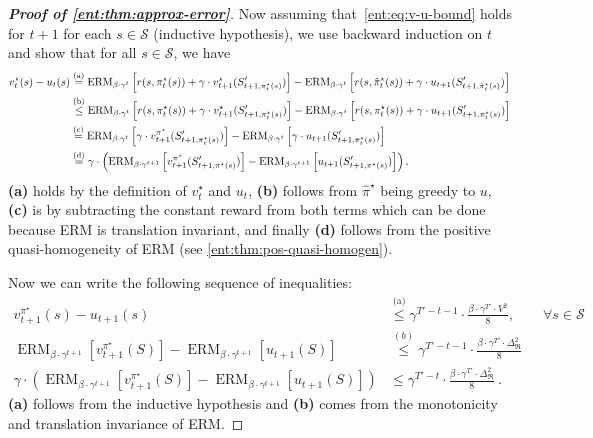 \documentclass[twoside]{article}
\newcommand{\states}{\mathcal{S}}
\newcommand{\opt}{^\star}
\newcommand{\vspan}{\Delta_{\mathfrak{R}}}
\newcommand{\erm}[2]{\operatorname{ERM}_{#1}\left[#2\right]}
\theoremstyle{plain}
\theoremstyle{definition}
\theoremstyle{remark}
\begin{document}
\begin{proof}[\bf\em Proof of \cref{ent:thm:approx-error}]
Now assuming that~\eqref{ent:eq:v-u-bound} holds for $t+1$ for each $s\in \states$ (inductive hypothesis), we use backward induction on $t$ and show that for all $s\in\mathcal S$, we have
%
\begin{align}
\notag v_t\opt (s) -  u_t(s) &\stackrel{\text{(a)}}{=} \erm{\beta \cdot \gamma^t} {r(s,\pi\opt_t (s)) + \gamma \cdot v\opt_{t+1}(S'_{t+1,\pi\opt_t(s)}) } - \erm{\beta \cdot \gamma^t} { r(s,\hat{\pi}\opt_t(s)) + \gamma \cdot u_{t+1}(S'_{t+1,\hat{\pi}\opt_t(s)}) } \\
\notag &\stackrel{\text{(b)}}{\leq} \erm{\beta \cdot \gamma^t} { r(s,\pi\opt_t (s)) + \gamma \cdot v\opt_{t+1}(S'_{t+1,\pi\opt_t(s)}) } - \erm{\beta \cdot \gamma^t} { r(s,\pi\opt_t(s)) + \gamma \cdot u_{t+1}(S'_{t+1,\pi\opt_t(s)}) } \\
\notag &\stackrel{\text{(c)}}{=} \erm{\beta \cdot \gamma^t} { \gamma \cdot v^{\pi\opt}_{t+1}(S'_{t+1,\pi\opt_t(s)}) } -  \erm{\beta \cdot \gamma^t} { \gamma \cdot u_{t+1}(S'_{t+1,\pi\opt_t(s)}) }  \\
\label{ent:eq:ubound-rhs} 
&\stackrel{\text{(d)}}{=} \gamma \cdot\left(\erm{\beta \cdot \gamma^{t+1}} {  v^{\pi\opt}_{t+1}(S'_{t+1,\pi\opt(s)}) } -  \erm{\beta \cdot \gamma^{t+1}} {  u_{t+1}(S'_{t+1,\pi\opt(s)}) } \right).
\end{align}
%
{\bf (a)} holds by the definition of $v\opt_t$ and $u_t$, {\bf (b)} follows from $\hat{\pi}\opt$ being greedy to $u$, {\bf (c)} is by subtracting the constant reward from both terms which can be done because ERM is translation invariant, and finally {\bf (d)} follows from the positive quasi-homogeneity of ERM (see \cref{ent:thm:pos-quasi-homogen}). 

Now we can write the following sequence of inequalities:
%
\begin{align}
v_{t+1}^{\pi\opt}(s) - u_{t+1}(s) &\stackrel{\text{(a)}}{\le} \gamma^{T' - t - 1}  \cdot \frac{\beta \cdot \gamma^{T'} \cdot V^2}{8},  \qquad \forall  s \in \states \nonumber \\
\erm{\beta \cdot \gamma^{t+1}}{v_{t+1}^{\pi\opt}(S)} - \erm{\beta \cdot \gamma^{t+1}}{u_{t+1}(S)} &\stackrel{(b)}{\le} \gamma^{T' - t - 1}  \cdot \frac{\beta \cdot \gamma^{T'} \cdot \vspan^2}{8} \nonumber \\
\gamma \cdot (\erm{\beta \cdot \gamma^{t+1}} {v_{t+1}^{\pi\opt}(S)} - \erm{\beta \cdot \gamma^{t+1}} {u_{t+1}(S)} ) &\le \gamma^{T' - t }  \cdot \frac{\beta \cdot \gamma^{T'} \cdot \vspan^2}{8} ~.
\label{ent:eq:approx-proof-bound}
\end{align}
%
{\bf (a)} follows from the inductive hypothesis and {\bf (b)} comes from the monotonicity and translation invariance of ERM. 


\end{proof}
\end{document}
